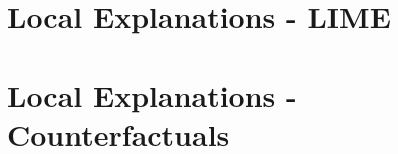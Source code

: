 \documentclass[11pt,compress,t,notes=noshow, aspectratio=169, xcolor=table]{beamer}
\begin{document}
% 
% 
\section{Local Explanations - LIME}

%

% 
% 


\section{Local Explanations - Counterfactuals}



%
%
\end{document}

